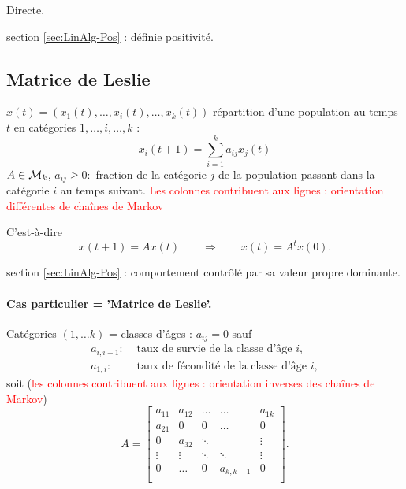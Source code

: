 \proof Directe. \eproof

\remark section \ref{sec:LinAlg-Pos} : définie positivité.

\subsection{Matrice de Leslie}  \label{sec:MatLeslie}

$x(t) = (x_1(t), \dots, x_i(t), \dots, x_k(t))$ répartition d'une population au temps $t$ en catégories $1, \dots, i, \dots, k$ :
$$
x_i(t+1) = \sum_{i=1}^k a_{ij} x_j(t) 
$$
$A \in \mathcal{M}_k$, $a_{ij} \geq 0 : $ fraction de la catégorie $j$ de la population passant dans la catégorie $i$ au temps suivant. \textcolor{red}{Les colonnes contribuent aux lignes : orientation différentes de chaînes de Markov}

C'est-à-dire
$$
x(t+1) = A x(t) 
\qquad \Rightarrow \qquad 
x(t) = A^t x(0).
$$

\remark section \ref{sec:LinAlg-Pos} : comportement contrôlé par sa valeur propre dominante.

\paragraph*{Cas particulier = 'Matrice de Leslie'.}

Catégories $(1, \dots k)$ = classes d'âges : $a_{ij} = 0$ sauf 
\begin{align*}
  a_{i, i-1} : & \text{ taux de survie de la classe d'âge $i$}, \\
  a_{1, i} : & \text{ taux de fécondité de la classe d'âge $i$}, 
\end{align*}
soit (\textcolor{red}{les colonnes contribuent aux lignes : orientation inverses des chaînes de Markov})
$$
A = \left[\begin{array}{cccccc}
            a_{11} & a_{12} & \dots  & \dots & a_{1k} \\
            a_{21} & 0 & 0  & \dots & 0 \\
            0 & a_{32} & \ddots & & \vdots \\
            \vdots & \vdots & \ddots & \ddots & \vdots \\
            0 & \dots & 0 & a_{k, k-1} & 0 \\
          \end{array}\right].
$$


